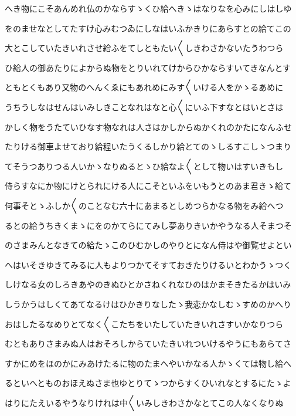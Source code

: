 \documentclass[a4paper,11pt,landscape]{ltjtarticle}
\begin{document}
\par\medskip
へき物にこそあんめれ仏のかならすゝくひ給へきゝはなりなを心みにしはしゆ
\par\medskip
をのませなとしてたすけ心みむつゐにしなはいふかきりにあらすとの給てこの
\par\medskip
大とこしていたきいれさせ給ふをてしともたい〱しきわさかないたうわつら
\par\medskip
ひ給人の御あたりによからぬ物をとりいれてけからひかならすいてきなんとす
\par\medskip
ともとくもあり又物のへんくゑにもあれめにみす〱いける人をかゝるあめに
\par\medskip
うちうしなはせんはいみしきことなれはなと心〱にいふ下すなとはいとさは
\par\medskip
かしく物をうたていひなす物なれは人さはかしからぬかくれのかたになんふせ
\par\medskip
たりける御車よせており給程いたうくるしかり給とてのゝしるすこしゝつまり
\par\medskip
てそうつありつる人いかゝなりぬるとゝひ給なよ〱として物いはすいきもし
\par\medskip
侍らすなにか物にけとられにける人にこそといふをいもうとのあま君きゝ給て
\par\medskip
何事そとゝふしか〱のことなむ六十にあまるとしめつらかなる物をみ給へつ
\par\medskip
るとの給うちきくまゝにをのかてらにてみし夢ありきいかやうなる人そまつそ
\par\medskip
のさまみんとなきての給たゝこのひむかしのやりとになん侍はや御覧せよとい
\par\medskip
へはいそきゆきてみるに人もよりつかてそすておきたりけるいとわかうゝつく
\par\medskip
しけなる女のしろきあやのきぬひとかさねくれなひのはかまそきたるかはいみ
\par\medskip
しうかうはしくてあてなるけはひかきりなしたゝ我恋かなしむゝすめのかへり
\par\medskip
おはしたるなめりとてなく〱こたちをいたしていたきいれさすいかなりつら
\par\medskip
むともありさまみぬ人はおそろしからていたきいれついけるやうにもあらてさ
\par\medskip
すかにめをほのかにみあけたるに物のたまへやいかなる人かゝくては物し給へ
\par\medskip
るといへとものおほえぬさま也ゆとりてゝつからすくひいれなとするにたゝよ
\par\medskip
はりにたえいるやうなりけれは中〱いみしきわさかなとてこの人なくなりぬ
\par\medskip
\end{document}
